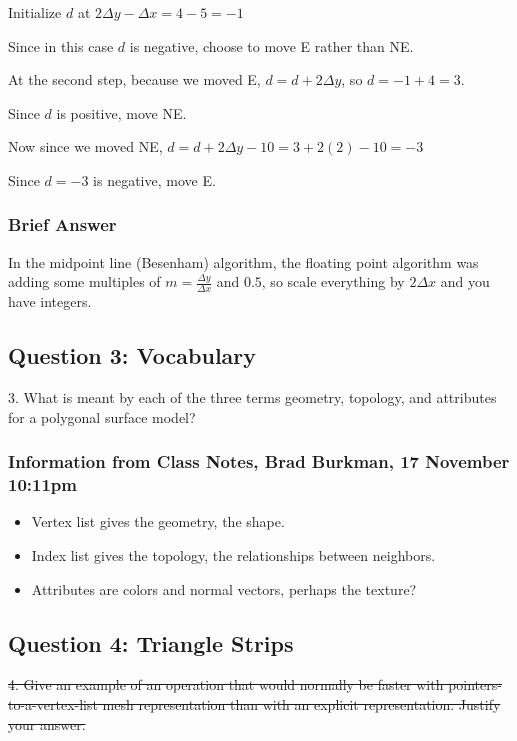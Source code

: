 \documentclass[11pt]{article}
\begin{document}
\begin{spacing}{1.2}
Initialize $d$ at $2\Delta y - \Delta x = 4-5 = -1$  

Since in this case $d$ is negative, choose to move E rather than NE.  

At the second step, because we moved E, $d = d+2\Delta y$, so $d = -1 + 4 = 3$.  

Since $d$ is positive, move NE.  

Now since we moved NE, $d = d+2 \Delta y - 10 = 3 + 2(2) - 10 = -3$

Since $d = -3$ is negative, move E.

\subsubsection{Brief Answer}

In the midpoint line (Besenham) algorithm, the floating point algorithm was adding some multiples of $m = \frac{\Delta y}{\Delta x}$ and $0.5$, so scale everything by $2\Delta x$ and you have integers.  

\subsection{Question 3:  Vocabulary}
3.  What is meant by each of the three terms geometry, topology, and attributes for a polygonal surface model?

\subsubsection{Information from Class Notes, Brad Burkman, 17 November 10:11pm}

\begin{itemize}
	\item Vertex list gives the geometry, the shape.  
	\item Index list gives the topology, the relationships between neighbors.  
	\item Attributes are colors and normal vectors, perhaps the texture?
\end{itemize}

\subsection{Question 4:  Triangle Strips}

\sout{4.  Give an example of an operation that would normally be faster with pointers-to-a-vertex-list mesh representation than with an explicit representation.  Justify your answer.  }


\end{spacing}
\end{document}

